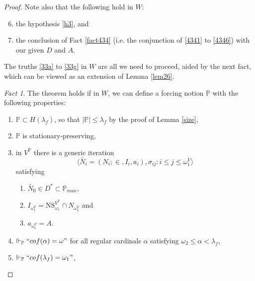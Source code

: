 \documentclass[12pt, twoside]{memoir}
\numberwithin{equation}{section}
\theoremstyle{definition}
\theoremstyle{remark}
\newtheorem{fact}[thm]{Fact}
\theoremstyle{definition}
\theoremstyle{definition}
\theoremstyle{definition}
\theoremstyle{remark}
\begin{document}
\begin{proof}
Note also that the following hold in $W$:
\begin{enumerate}[label=(\Alph*)]
    \setcounter{enumi}{5}
    \item the hypothesis \ref{h3}, and
    \item\label{33g} the conclusion of Fact \ref{fact434} (i.e. the conjunction of \ref{4341} to \ref{4346}) with our given $D$ and $A$. 
\end{enumerate}

The truths \ref{33a} to \ref{33g} in $W$ are all we need to proceed, aided by the next fact, which can be viewed as an extension of Lemma \ref{lem26}.

\begin{fact}\label{fact436}
The theorem holds if in $W$, we can define a forcing notion $\mathbb{P}$ with the following properties: 
\begin{enumerate}[label=(K\arabic*), leftmargin=40pt]
    \item\label{K1} $\mathbb{P} \subset H(\lambda_f)$, so that $|\mathbb{P}| \leq \lambda_f$ by the proof of Lemma \ref{size},
    \item\label{K2} $\mathbb{P}$ is stationary-preserving, 
    \item\label{K3} in $V^{\mathbb{P}}$ there is a generic iteration $$\langle \bar{N}_i = (N_i; \in, I_i, a_i), \sigma_{ij} : i \leq j \leq \omega_1^V \rangle$$ satisfying 
    \begin{enumerate}[label=(\arabic*), leftmargin=40pt]
        \item\label{k31} $\bar{N}_0 \in D^* \subset \mathbb{P}_{max}$,
        \item\label{k32} $I_{\omega_1^V} = \mathrm{NS}_{\omega_1}^{V^{\mathbb{P}}} \cap N_{\omega_1^V}$ and
        \item\label{k33} $a_{\omega_1^V} = A$.
    \end{enumerate} 
    \item\label{K4} $\Vdash_{\mathbb{P}} ``cof(\alpha) = \omega"$ for all regular cardinals $\alpha$ satisfying $\omega_2 \leq \alpha < \lambda_f$,
    \item\label{K5} $\Vdash_{\mathbb{P}} ``cof(\lambda_f) = \omega_1"$,
\end{enumerate}
\end{fact}


\end{proof}
\end{document}
